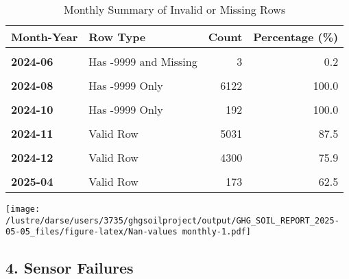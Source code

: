 \documentclass[
]{article}
\begin{document}
\begin{longtable}[t]{>{}llrr}
\caption{\label{tab:Nan-values monthly}Monthly Summary of Invalid or Missing Rows}\\
\toprule
Month-Year & Row Type & Count & Percentage (\%)\\
\midrule
\textbf{\cellcolor{gray!10}{2024-06}} & \cellcolor{gray!10}{Has -9999 Only} & \cellcolor{gray!10}{1958} & \cellcolor{gray!10}{99.8}\\
\textbf{2024-06} & Has -9999 and Missing & 3 & 0.2\\
\textbf{\cellcolor{gray!10}{2024-07}} & \cellcolor{gray!10}{Has -9999 Only} & \cellcolor{gray!10}{6557} & \cellcolor{gray!10}{100.0}\\
\textbf{2024-08} & Has -9999 Only & 6122 & 100.0\\
\textbf{\cellcolor{gray!10}{2024-09}} & \cellcolor{gray!10}{Has -9999 Only} & \cellcolor{gray!10}{4396} & \cellcolor{gray!10}{100.0}\\
\addlinespace
\textbf{2024-10} & Has -9999 Only & 192 & 100.0\\
\textbf{\cellcolor{gray!10}{2024-11}} & \cellcolor{gray!10}{Has -9999 Only} & \cellcolor{gray!10}{721} & \cellcolor{gray!10}{12.5}\\
\textbf{2024-11} & Valid Row & 5031 & 87.5\\
\textbf{\cellcolor{gray!10}{2024-12}} & \cellcolor{gray!10}{Has -9999 Only} & \cellcolor{gray!10}{1366} & \cellcolor{gray!10}{24.1}\\
\textbf{2024-12} & Valid Row & 4300 & 75.9\\
\addlinespace
\textbf{\cellcolor{gray!10}{2025-04}} & \cellcolor{gray!10}{Has -9999 Only} & \cellcolor{gray!10}{104} & \cellcolor{gray!10}{37.5}\\
\textbf{2025-04} & Valid Row & 173 & 62.5\\
\bottomrule
\end{longtable}

\texttt{[image: /lustre/darse/users/3735/ghgsoilproject/output/GHG\_SOIL\_REPORT\_2025-05-05\_files/figure-latex/Nan-values monthly-1.pdf]}

\hypertarget{sensor-failures}{%
\subsection{4. Sensor Failures}\label{sensor-failures}}
\end{document}
